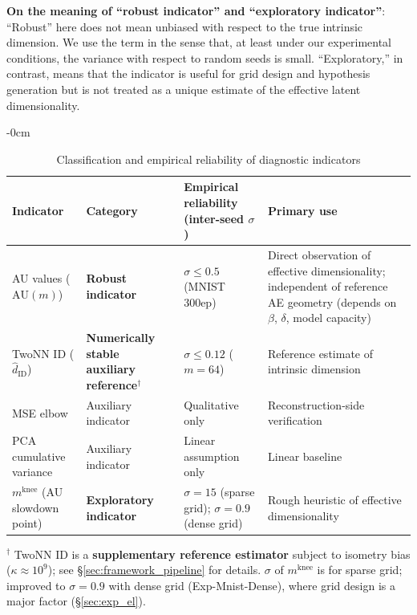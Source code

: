 \documentclass[make,article,submit,pdftex,moreauthors]{Definitions/mdpi}
\newcommand{\kap}{\kappa}
\newcommand{\mknee}{m^{\mathrm{knee}}}
\begin{document}
\textbf{On the meaning of ``robust indicator'' and ``exploratory indicator''}:
``Robust'' here does not mean unbiased with respect to the true intrinsic dimension.
We use the term in the sense that, at least under our experimental conditions,
the variance with respect to random seeds is small.
``Exploratory,'' in contrast, means that the indicator is useful for grid design
and hypothesis generation but is not treated as a unique estimate of the
effective latent dimensionality.

\begin{table}[H]
\begin{adjustwidth}{-\extralength}{0cm}
\centering
\caption{Classification and empirical reliability of diagnostic indicators}
\label{tab:indicator_class}
\small
\begin{tabular}{p{3.2cm}p{3.0cm}p{3.8cm}p{3.8cm}}
\toprule
Indicator & Category & Empirical reliability (inter-seed $\sigma$) & Primary use \\
\midrule
AU values ($\mathrm{AU}(m)$) & \textbf{Robust indicator} & $\sigma \leq 0.5$ (MNIST 300ep) & Direct observation of effective dimensionality; independent of reference AE geometry (depends on $\beta$, $\delta$, model capacity) \\
TwoNN ID ($\hat{d}_\mathrm{ID}$) & \textbf{Numerically stable auxiliary reference}$^\dagger$ & $\sigma \leq 0.12$ ($m=64$) & Reference estimate of intrinsic dimension \\
MSE elbow & Auxiliary indicator & Qualitative only & Reconstruction-side verification \\
PCA cumulative variance & Auxiliary indicator & Linear assumption only & Linear baseline \\
$\mknee$ (AU slowdown point) & \textbf{Exploratory indicator} & $\sigma=15$ (sparse grid); $\sigma=0.9$ (dense grid) & Rough heuristic of effective dimensionality \\
\bottomrule
\end{tabular}
\par\medskip
\footnotesize
$^\dagger$ TwoNN ID is a \textbf{supplementary reference estimator} subject to isometry bias ($\kap \approx 10^9$); see §\ref{sec:framework_pipeline} for details.
$\sigma$ of $\mknee$ is for sparse grid; improved to $\sigma=0.9$ with dense grid (Exp-Mnist-Dense), where grid design is a major factor (§\ref{sec:exp_el}).
\normalsize
\end{adjustwidth}
\end{table}
\end{document}
